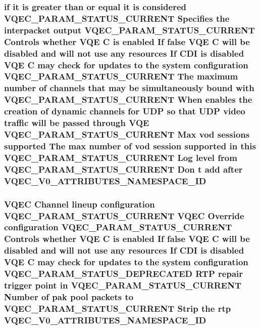 \subsubsection{\setlength{\rightskip}{0pt plus 5cm}if it is greater than or equal it is considered VQEC\_\-PARAM\_\-STATUS\_\-CURRENT Specifies the interpacket output VQEC\_\-PARAM\_\-STATUS\_\-CURRENT Controls whether VQE \bf{C} is enabled If false VQE \bf{C} will be disabled and will not use any resources If CDI is disabled VQE \bf{C} may check for updates \bf{to} the system configuration VQEC\_\-PARAM\_\-STATUS\_\-CURRENT The maximum number of \bf{channels} that may be simultaneously bound with VQEC\_\-PARAM\_\-STATUS\_\-CURRENT When enables the creation of dynamic \bf{channels} for UDP so that UDP video traffic will be passed through VQE VQEC\_\-PARAM\_\-STATUS\_\-CURRENT Max vod sessions supported The max number of vod session supported in \bf{this} VQEC\_\-PARAM\_\-STATUS\_\-CURRENT Log level from VQEC\_\-PARAM\_\-STATUS\_\-CURRENT Don t add after \bf{VQEC\_\-V0\_\-ATTRIBUTES\_\-NAMESPACE\_\-ID}}\label{vqec__cfg__settings_8h_27cb8b339f2d8f41f564258d0a90e5b6}


\subsubsection{\setlength{\rightskip}{0pt plus 5cm}VQEC Channel lineup configuration VQEC\_\-PARAM\_\-STATUS\_\-CURRENT VQEC Override configuration VQEC\_\-PARAM\_\-STATUS\_\-CURRENT Controls whether VQE \bf{C} is enabled If false VQE \bf{C} will be disabled and will not use any resources If CDI is disabled VQE \bf{C} may check for updates \bf{to} the system configuration VQEC\_\-PARAM\_\-STATUS\_\-DEPRECATED RTP repair trigger point in VQEC\_\-PARAM\_\-STATUS\_\-CURRENT Number of pak pool packets \bf{to} VQEC\_\-PARAM\_\-STATUS\_\-CURRENT Strip the rtp \bf{VQEC\_\-V0\_\-ATTRIBUTES\_\-NAMESPACE\_\-ID}}\label{vqec__cfg__settings_8h_24333049fe916b0496fece8ec67c2d04}


